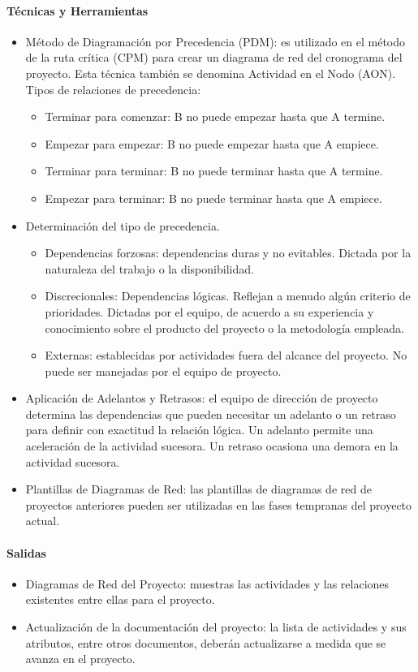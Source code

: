 \documentclass[a4paper,twosides]{article}
\newlength{\wideitemsep}
\let\olditem\item
\renewcommand{\item}{\setlength{\itemsep}{\wideitemsep}\olditem}
\begin{document}
\paragraph{Técnicas y Herramientas}
\begin{itemize}
\item Método de Diagramación por Precedencia (PDM): es utilizado en el método de la ruta crítica (CPM) para crear un diagrama de red del cronograma del proyecto. Esta técnica también se denomina Actividad en el Nodo (AON).
Tipos de relaciones de precedencia:
\begin{itemize}
\item Terminar para comenzar: B no puede empezar hasta que A termine.
\item Empezar para empezar: B no puede empezar hasta que A empiece.
\item Terminar para terminar: B no puede terminar hasta que A termine.
\item Empezar para terminar: B no puede terminar hasta que A empiece.
\end{itemize}
\item Determinación del tipo de precedencia.
\begin{itemize}
\item Dependencias forzosas: dependencias duras y no evitables. Dictada por la naturaleza del trabajo o la disponibilidad.
\item Discrecionales: Dependencias lógicas. Reflejan a menudo algún criterio de prioridades. Dictadas por el equipo, de acuerdo a su experiencia y conocimiento sobre el producto del proyecto o la metodología empleada.
\item Externas: establecidas por actividades fuera del alcance del proyecto. No puede ser manejadas por el equipo de proyecto.
\end{itemize}
\item Aplicación de Adelantos y Retrasos: el equipo de dirección de proyecto determina las dependencias que pueden necesitar un adelanto o un retraso para definir con exactitud la relación lógica. Un adelanto permite una aceleración de la actividad sucesora. Un retraso ocasiona una demora en la actividad sucesora.
\item Plantillas de Diagramas de Red: las plantillas de diagramas de red de proyectos anteriores pueden ser utilizadas en las fases tempranas del proyecto actual.
\end{itemize}

\paragraph{Salidas}
\begin{itemize}
\item Diagramas de Red del Proyecto: muestras las actividades y las relaciones existentes entre ellas para el proyecto.
\item Actualización de la documentación del proyecto: la lista de actividades y sus atributos, entre otros documentos, deberán actualizarse a medida que se avanza en el proyecto.
\end{itemize}
\end{document}
